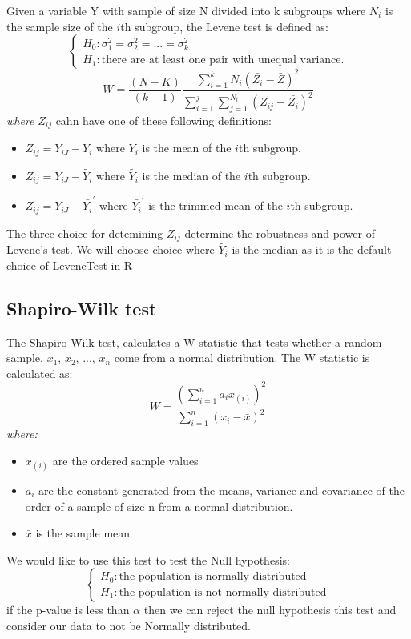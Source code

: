 Given a variable Y with sample of size N divided into k subgroups where $N_i$ is the sample size of the $i$th subgroup, the Levene test is defined as:
\[
\begin{cases}
    H_0: \sigma_1^2 = \sigma_2^2 =...=\sigma_k^2 \\ 
    H_1: \text{there are at least one pair with unequal variance.}
\end{cases}
\]
\[W = \frac{(N-K)}{(k-1)}\frac{\sum_{i=1}^{k}N_i(\bar{Z_i}-\bar{Z})^2}{\sum_{i=1}^{j}\sum_{j=1}^{N_i}(Z_{ij}-\bar{Z_i})^2}\]
\textit{where} $Z_{ij}$ cahn have one of these following definitions:

\begin{itemize}
    \item $Z_{ij} = Y_{iJ} - \bar{Y_i}$ where $\bar{Y_i}$ is the mean  of the $i$th subgroup.
    \item $Z_{ij} = Y_{iJ} - \tilde{Y_i}$ where $\tilde{Y_i}$ is the median of the $i$th subgroup.
    \item $Z_{ij} = Y_{iJ} - \bar{Y_i}^{'}$ where $\bar{Y_i}^{'}$ is the trimmed mean of the $i$th subgroup.
\end{itemize}

The three choice for detemining $Z_{ij}$ determine the robustness and power of Levene's test. We will choose choice where $\tilde{Y_i}$ is the median as it is the default choice of LeveneTest in R

\subsection{Shapiro-Wilk test}
The Shapiro-Wilk test, calculates a W statistic that tests whether a random sample, $x_1$, $x_2$, ..., $x_n$ come from a normal distribution. 
The W statistic is calculated as:
\[W = \frac{(\sum_{i=1}^{n}a_ix_{(i)})^2}{\sum_{i=1}^{n}(x_i-\bar{x})^2}\]
\textit{where:}
\begin{itemize}
    \item $x_{(i)}$ are the ordered sample values
    \item $a_i$ are the constant generated from the means, variance and covariance of the order of a sample of size n from a normal distribution.
    \item $\bar{x}$ is the sample mean
\end{itemize}

We would like to use this test to test the Null hypothesis:
\[
\begin{cases}
    H_0: \text{the population is normally distributed} \\
    H_1: \text{the population is not normally distributed}
\end{cases}
\]
if the p-value is less than $\alpha$ then we can reject the null hypothesis this test and consider our data to not be Normally distributed.

